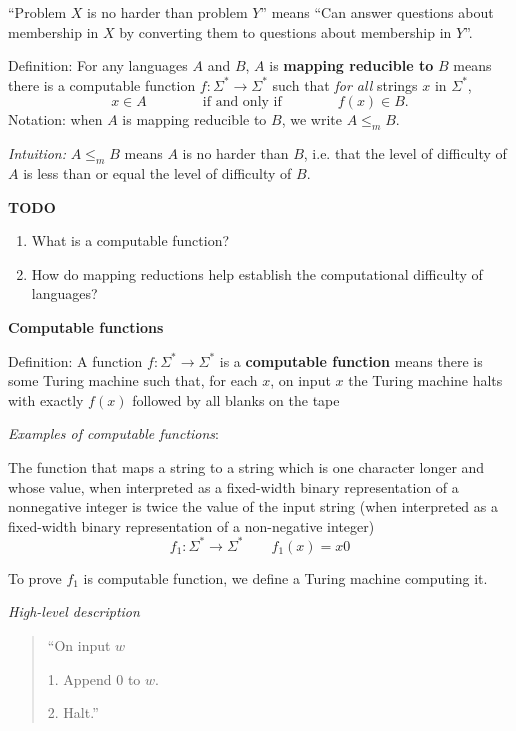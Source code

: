 \documentclass[12pt, oneside]{article}
\begin{document}
``Problem $X$ is no harder than problem $Y$'' means 
``Can answer questions about membership in $X$ by converting them to questions about membership in $Y$''.



Definition: For any languages $A$ and $B$, $A$ is  {\bf  mapping  reducible to} $B$  means there is a computable function 
$f : \Sigma^* \to \Sigma^*$ such that {\it for all} strings  $x$ in $\Sigma^*$, 
\[
x  \in  A \qquad \qquad \text{if and  only  if} \qquad \qquad f(x) \in B.
\]
Notation:  when $A$  is mapping reducible to $B$, we write $A  \leq_m B$.

\vfill

{\it Intuition:} $A \leq_m B$ means $A$ is no harder than $B$, i.e. that the level 
of difficulty of $A$ is less than or equal the level of difficulty of $B$.

\vfill

{\bf TODO} 
\begin{enumerate}
\item What is a computable function?
\item How do mapping reductions help establish the computational difficulty of languages?
\end{enumerate}

\vfill
\newpage
{\bf Computable functions}

Definition: A function $f: \Sigma^* \to \Sigma^*$ is a {\bf computable function} means there is some Turing machine such that, 
for each $x$, on input $x$ the Turing machine halts with exactly $f(x)$ followed by all blanks on the tape

\vspace{50pt}


{\it Examples of computable functions}:

The function that maps a string to a string which is one character longer and 
whose value, when interpreted as a fixed-width binary representation of a
nonnegative integer is twice the value of the input string (when interpreted as 
a fixed-width binary representation of a non-negative integer)
\[
f_1: \Sigma^* \to \Sigma^* \qquad  f_1(x)  = x0
\]

To prove $f_1$ is computable function, we define a Turing machine computing it.

{\it High-level description}
\begin{quote}
    ``On input $w$
    
    1. Append $0$ to $w$.
    
    2. Halt.''
\end{quote}
\end{document}
